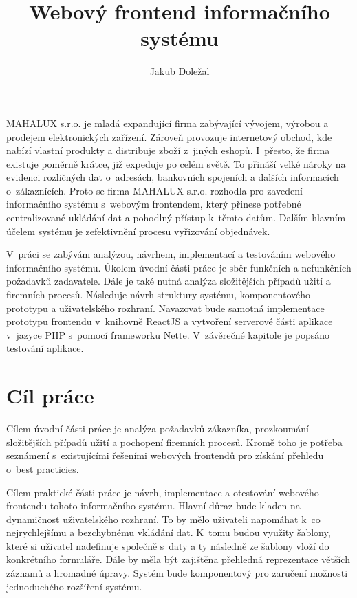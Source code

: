 \documentclass[thesis=B,czech]{FITthesis}[2012/06/26]
\title{Webový frontend informačního systému}
\author{Jakub Doležal} %
\begin{document}

\begin{introduction}
	MAHALUX s.r.o. je mladá expandující firma zabývající vývojem, výrobou a prodejem elektronických zařízení. Zároveň provozuje internetový obchod, kde nabízí vlastní produkty a distribuje zboží z~jiných eshopů. I~přesto, že firma existuje poměrně krátce, již expeduje po celém světě. To přináší velké nároky na evidenci rozličných dat o~adresách, bankovních spojeních a dalších informacích o~zákaznících. Proto se firma MAHALUX s.r.o. rozhodla pro zavedení informačního systému s~webovým frontendem, který přinese potřebné centralizované ukládání dat a pohodlný přístup k~těmto datům. Dalším hlavním účelem systému je zefektivnění procesu vyřizování objednávek.
	
	V~práci se zabývám analýzou, návrhem, implementací a testováním webového informačního systému.
	Úkolem úvodní části práce je sběr funkčních a nefunkčních požadavků zadavatele. Dále je také nutná analýza složitějších případů užití a firemních procesů. Následuje návrh struktury systému, komponentového prototypu a uživatelského rozhraní. Navazovat bude samotná implementace prototypu frontendu v~knihovně ReactJS a vytvoření serverové části aplikace v~jazyce PHP s~pomocí frameworku Nette. V~závěrečné kapitole je popsáno testování aplikace.
\end{introduction}

\chapter{Cíl práce}
	Cílem úvodní části práce je analýza požadavků zákazníka, prozkoumání složitějších případů užití a pochopení firemních procesů. Kromě toho je potřeba seznámení s~existujícími řešeními webových frontendů pro získání přehledu o~best practicies.
	
	Cílem praktické části práce je návrh, implementace a otestování webového frontendu tohoto informačního systému. Hlavní důraz bude kladen na dynamičnost uživatelského rozhraní. To by mělo uživateli napomáhat k~co nejrychlejšímu a bezchybnému vkládání dat. K~tomu budou využity šablony, které si uživatel nadefinuje společně s~daty a ty následně ze šablony vloží do konkrétního formuláře. Dále by měla být zajištěna přehledná reprezentace větších záznamů a hromadné úpravy. Systém bude komponentový pro zaručení možnosti jednoduchého rozšíření systému.
	
\end{document}
